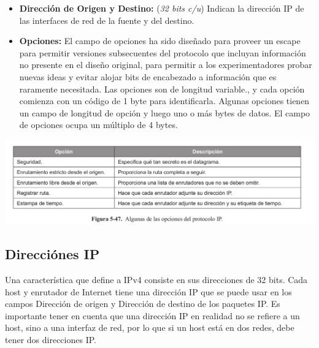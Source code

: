 \begin{itemize}
		\item \textbf{Dirección de Origen y Destino:} (\textit{32 bits c/u}) Indican la dirección IP de las interfaces de red de la fuente y del destino.
		\item \textbf{Opciones:} El campo de opciones ha sido diseñado para proveer un escape para permitir versiones subsecuentes del protocolo que incluyan
información no presente en el diseño original, para permitir a los experimentadores probar nuevas ideas y evitar alojar bits de encabezado a información que es raramente necesitada. Las opciones son de longitud variable., y cada opción comienza con un código de 1 byte para identificarla. Algunas opciones tienen un campo de longitud de opción y luego uno o más bytes de datos. El campo de opciones ocupa un múltiplo de 4 bytes.
	\end{itemize}
	
	\begin{center}
		\includegraphics[scale=0.3]{./imagenes/opcionesIP.png} 
	\end{center}
	\subsection{Direcciónes IP}
	Una característica que define a IPv4 consiste en sus direcciones de 32 bits. Cada host y enrutador de Internet tiene una dirección IP que se puede usar en los campos Dirección de origen y Dirección de destino de los paquetes IP. Es importante tener en cuenta que una dirección IP en realidad no se refiere a un host, sino
a una interfaz de red, por lo que si un host está en dos redes, debe tener dos direcciones IP.
